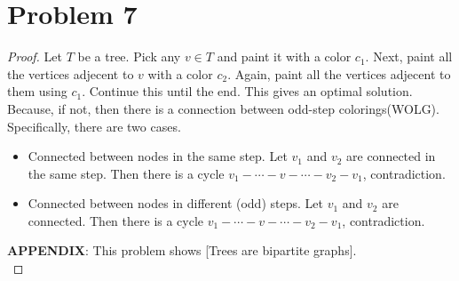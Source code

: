 \section*{Problem 7}
	\begin{proof}
		Let $T$ be a tree. Pick any $v\in T$ and paint it with a color $c_1$. Next, paint all the vertices adjecent to $v$ with a color $c_2$. Again, paint all the vertices adjecent to them using $c_1$. Continue this until the end. This gives an optimal solution. Because, if not, then there is a connection between odd-step colorings(WOLG). Specifically, there are two cases.
		\begin{itemize}
			\item Connected between nodes in the same step. Let $v_1$ and $v_2$ are connected in the same step. Then there is a cycle $v_1 - \cdots - v - \cdots - v_2 - v_1$, contradiction.
			\item Connected between nodes in different (odd) steps. Let $v_1$ and $v_2$ are connected. Then there is a cycle $v_1 - \cdots - v - \cdots - v_2 - v_1$, contradiction.
		\end{itemize}
	{\color{cyan}\textbf{APPENDIX}}: This problem shows [Trees are bipartite graphs].\\
	\end{proof}